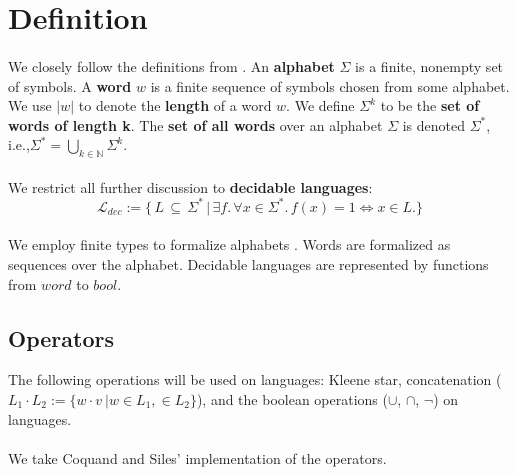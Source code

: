 \documentclass[11pt,a4paper,oneside]{book}
\begin{document}
    \section{Definition}
        \paragraph{}
        We closely follow the definitions from \cite{DBLP:books/daglib/0011126}.
        An \textbf{alphabet} $\Sigma$ is a finite, nonempty set of symbols. 
        A \textbf{word} $w$ is a finite sequence of symbols chosen from some alphabet. 
        We use $|w|$ to denote the \textbf{length} of a word $w$. 
        We define $\Sigma^k$ to be the \textbf{set of words of length k}.
        The \textbf{set of all words} over an alphabet $\Sigma$ is denoted $\Sigma^*$, i.e.,$\Sigma^* = \bigcup_{k \in \mathbb{N}} \Sigma^k$.
        
        \paragraph{} We restrict all further discussion to \textbf{decidable languages}:
        \[
            \mathcal{L}_{dec} := \{ \, L \, \subseteq \, \Sigma^* \, 
                \vert \, \exists f. \, \forall x \in \Sigma^*. \, f(x) = 1 \Leftrightarrow  x \in L. \}
        \] 

        \paragraph{} 
            We employ finite types to formalize alphabets . 
            Words are formalized as sequences over the alphabet.
            Decidable languages are represented by functions from $word$ to $bool$.

        \subsection{Operators}
            The following operations will be used on languages: Kleene star, concatenation ($L_1 \cdot L_2 := \{w \cdot v\ \vert w \in L_1,  \in L_2\}$), and the boolean operations ($\cup$, $\cap$, $\neg$) on languages.

            \paragraph{}
                We take Coquand and Siles' implementation of the operators.
\end{document}
